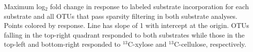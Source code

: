 Maximum log$_{2}$ fold change in response to labeled substrate incorporation for each substrate and all OTUs that pass sparsity filtering in both substrate analyses. Points colored by response. Line has slope of 1 with intercept at the origin. OTUs falling in the top-right quadrant responded to both substrates while those in the top-left and bottom-right responded to $^{13}$C-xylose and $^{13}$C-cellulose, respectively.